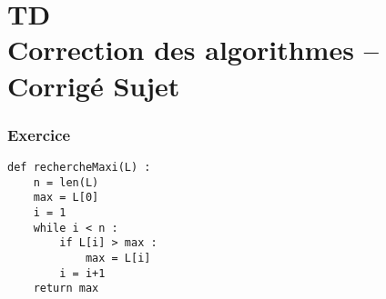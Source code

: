 \chapter*{TD  \\ 
Correction des algorithmes -- 
\ifprof Corrigé \else Sujet \fi}

\iflivret {} \else
\ifprof  {} \else \fi
\fi

\setcounter{question}{0}


%
%
%
%

\subsection*{Exercice}

\begin{marginfigure}
\begin{lstlisting}
def rechercheMaxi(L) :
    n = len(L)
    max = L[0]
    i = 1
    while i < n :
        if L[i] > max :
            max = L[i]
        i = i+1
    return max
\end{lstlisting}
\end{marginfigure}

